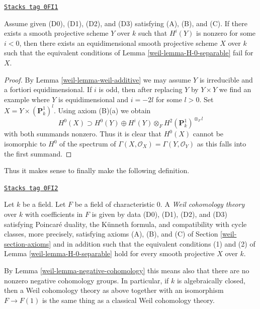 \begin{lemma}
\label{weil-lemma-negative-cohomology}
\href{https://stacks.math.columbia.edu/tag/0FI1}{\texttt{Stacks tag 0FI1}}

Assume given (D0), (D1), (D2), and (D3) satisfying (A), (B), and (C).
If there exists a smooth projective scheme $Y$ over $k$ such that
$H^i(Y)$ is nonzero for some $i < 0$, then there exists an equidimensional
smooth projective scheme $X$ over $k$ such that the equivalent conditions
of Lemma \ref{weil-lemma-H-0-separable} fail for $X$.
\end{lemma}

\begin{proof}

By Lemma \ref{weil-lemma-weil-additive} we may assume $Y$ is irreducible
and a fortiori equidimensional. If $i$ is odd, then after replacing
$Y$ by $Y \times Y$ we find an example where $Y$ is equidimensional
and $i = -2l$ for some $l > 0$. Set $X = Y \times (\mathbf{P}^1_k)^l$.
Using axiom (B)(a) we obtain
$$
H^0(X) \supset H^0(Y) \oplus
H^i(Y) \otimes_F H^2(\mathbf{P}^1_k)^{\otimes_F l}
$$
with both summands nonzero. Thus it is clear that $H^0(X)$ cannot be
isomorphic to $H^0$ of the spectrum of
$\Gamma(X, \mathcal{O}_X) = \Gamma(Y, \mathcal{O}_Y)$
as this falls into the first summand.
\end{proof}

Thus it makes sense to finally make the following definition.

\begin{definition}
\label{weil-definition-weil-cohomology-theory}
\href{https://stacks.math.columbia.edu/tag/0FI2}{\texttt{Stacks tag 0FI2}}

Let $k$ be a field. Let $F$ be a field of characteristic $0$.
A {\it Weil cohomology theory} over $k$ with coefficients in $F$
is given by data (D0), (D1), (D2), and (D3) satisfying
Poincar\'e duality, the K\"unneth formula, and compatibility
with cycle classes, more precisely, satisfying axioms (A), (B), and (C)
of Section \ref{weil-section-axioms}
and in addition such that the equivalent conditions (1) and (2) of
Lemma \ref{weil-lemma-H-0-separable} hold for every smooth projective $X$ over $k$.
\end{definition}

By Lemma \ref{weil-lemma-negative-cohomology} this means also that there are no
nonzero negative cohomology groups. In particular, if $k$ is algebraically
closed, then a Weil cohomology theory as above together with an isomorphism
$F \to F(1)$ is the same thing as a classical Weil cohomology theory.

